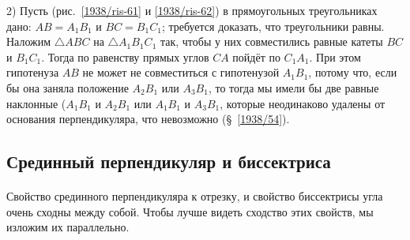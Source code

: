 \documentclass[oneside]{book}
\begin{document}
2) Пусть (рис.~\ref{1938/ris-61} и \ref{1938/ris-62}) в прямоугольных треугольниках дано:
$AB=A_1B_1$ и $BC=B_1C_1$;
требуется доказать, что треугольники равны.
Наложим $\triangle ABC$ на $\triangle A_1B_1C_1$ так, чтобы у них совместились равные катеты $BC$ и $B_1C_1$.
Тогда по равенству прямых углов $CA$ пойдёт по $C_1A_1$.
При этом гипотенуза $AB$ не может не совместиться с гипотенузой $A_1B_1$, потому что, если бы она заняла положение $A_2B_1$ или $A_3B_1$, то тогда мы имели бы две равные наклонные ($A_1B_1$ и $A_2B_1$ или $A_1B_1$ и $A_3B_1$, которые неодинаково удалены от основания перпендикуляра, что невозможно (§~\ref{1938/54}).

\subsection*{Срединный перпендикуляр и биссектриса} 

\paragraph{}\label{1938/58}
Свойство срединного перпендикуляра к отрезку, и свойство биссектрисы угла очень сходны между собой.
Чтобы лучше видеть сходство этих свойств, мы изложим их параллельно.
\end{document}
